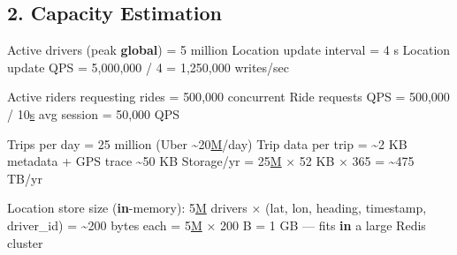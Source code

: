 \documentclass[11pt]{article}
\newenvironment{Shaded}{\begin{snugshade}}{\end{snugshade}}
\newcommand{\BuiltInTok}[1]{\textcolor[rgb]{0.50,0.55,0.55}{#1}}
\newcommand{\DecValTok}[1]{\textcolor[rgb]{0.96,0.45,0.00}{#1}}
\newcommand{\ErrorTok}[1]{\textcolor[rgb]{0.85,0.27,0.33}{\underline{#1}}}
\newcommand{\KeywordTok}[1]{\textcolor[rgb]{0.81,0.81,0.76}{\textbf{#1}}}
\newcommand{\NormalTok}[1]{\textcolor[rgb]{0.81,0.81,0.76}{#1}}
\newcommand{\OperatorTok}[1]{\textcolor[rgb]{0.81,0.81,0.76}{#1}}
\begin{document}
\subsection{2. Capacity Estimation}\label{2-capacity-estimation-1}


\begin{Shaded}
\begin{Highlighting}[]
\NormalTok{Active drivers (peak }\KeywordTok{global}\NormalTok{)   }\OperatorTok{=} \DecValTok{5}\NormalTok{ million}
\NormalTok{Location update interval       }\OperatorTok{=} \DecValTok{4}\NormalTok{ s}
\NormalTok{Location update QPS            }\OperatorTok{=} \DecValTok{5}\NormalTok{,}\DecValTok{000}\NormalTok{,}\DecValTok{000} \OperatorTok{/} \DecValTok{4} \OperatorTok{=} \DecValTok{1}\NormalTok{,}\DecValTok{250}\NormalTok{,}\DecValTok{000}\NormalTok{ writes}\OperatorTok{/}\NormalTok{sec}

\NormalTok{Active riders requesting rides }\OperatorTok{=} \DecValTok{500}\NormalTok{,}\DecValTok{000}\NormalTok{ concurrent}
\NormalTok{Ride requests QPS              }\OperatorTok{=} \DecValTok{500}\NormalTok{,}\DecValTok{000} \OperatorTok{/} \DecValTok{10}\ErrorTok{s}\NormalTok{ avg session }\OperatorTok{=} \DecValTok{50}\NormalTok{,}\DecValTok{000}\NormalTok{ QPS}

\NormalTok{Trips per day                  }\OperatorTok{=} \DecValTok{25}\NormalTok{ million (Uber }\OperatorTok{\textasciitilde{}}\DecValTok{20}\ErrorTok{M}\OperatorTok{/}\NormalTok{day)}
\NormalTok{Trip data per trip             }\OperatorTok{=} \OperatorTok{\textasciitilde{}}\DecValTok{2}\NormalTok{ KB metadata }\OperatorTok{+}\NormalTok{ GPS trace }\OperatorTok{\textasciitilde{}}\DecValTok{50}\NormalTok{ KB}
\NormalTok{Storage}\OperatorTok{/}\NormalTok{yr                     }\OperatorTok{=} \DecValTok{25}\ErrorTok{M}\NormalTok{ × }\DecValTok{52}\NormalTok{ KB × }\DecValTok{365} \OperatorTok{=} \OperatorTok{\textasciitilde{}}\DecValTok{475}\NormalTok{ TB}\OperatorTok{/}\NormalTok{yr}

\NormalTok{Location store size (}\KeywordTok{in}\OperatorTok{{-}}\NormalTok{memory):}
  \DecValTok{5}\ErrorTok{M}\NormalTok{ drivers × (lat, lon, heading, timestamp, driver\_id) }\OperatorTok{=} \OperatorTok{\textasciitilde{}}\DecValTok{200} \BuiltInTok{bytes}\NormalTok{ each}
  \OperatorTok{=} \DecValTok{5}\ErrorTok{M}\NormalTok{ × }\DecValTok{200}\NormalTok{ B }\OperatorTok{=} \DecValTok{1}\NormalTok{ GB — fits }\KeywordTok{in}\NormalTok{ a large Redis cluster}
\end{Highlighting}
\end{Shaded}
\end{document}
